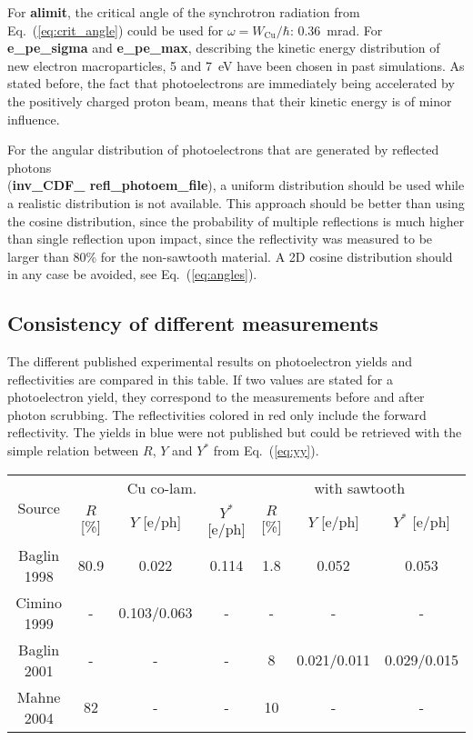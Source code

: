 For \textbf{alimit}, the critical angle of the synchrotron radiation from Eq.~(\ref{eq:crit_angle}) could be used for $\omega = W_\text{Cu}/\hbar$: 0.36~mrad.
For \textbf{e\_pe\_sigma} and \textbf{e\_pe\_max}, describing the kinetic energy distribution of new electron macroparticles, 5 and 7~eV have been chosen in past simulations.
As stated before, the fact that photoelectrons are immediately being accelerated by the positively charged proton beam, means that their kinetic energy is of minor influence.

For the angular distribution of photoelectrons that are generated by reflected photons
\\
(\textbf{inv\_CDF\_ refl\_photoem\_file}), a uniform distribution should be used while a realistic distribution is not available.
This approach should be better than using the cosine distribution, since the probability of multiple reflections is much higher than single reflection upon impact, since the reflectivity was measured to be larger than 80\% for the non-sawtooth material.
A 2D cosine distribution should in any case be avoided, see Eq.~(\ref{eq:angles}).


\subsection{Consistency of different measurements}

The different published experimental results on photoelectron yields and reflectivities are compared in this table.
If two values are stated for a photoelectron yield, they correspond to the measurements before and after photon scrubbing.
The reflectivities colored in red only include the forward reflectivity.
The yields in blue were not published but could be retrieved with the simple relation between $R$, $Y$ and $Y^*$ from Eq.~(\ref{eq:yy}).
\begin{center}
    \begin{tabular}{c|ccc|ccc}
        \multirow{2}{*}{Source} & \multicolumn{3}{c|}{Cu co-lam.} & \multicolumn{3}{|c}{with sawtooth} \\
        & $R$ [\%] & $Y$ [e/ph]& $Y^*$ [e/ph]& $R$ [\%]& $Y$ [e/ph]& $Y^*$ [e/ph] \\\hline
        Baglin 1998 & {\color{red}80.9} & {\color{blue}0.022} & 0.114 & {\color{red}1.8} & {\color{blue} 0.052} & 0.053 \\
        Cimino 1999 & - & 0.103/0.063 & - & - & - & - \\
        Baglin 2001 & - & - & - & {\color{red}8} & {\color{blue}0.021/0.011} & 0.029/0.015 \\
        Mahne 2004 & 82 & - & - & 10 & - & - \\
    \end{tabular}
\end{center}

